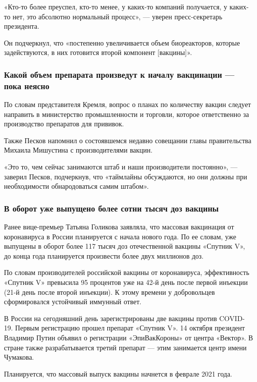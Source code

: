 «Кто-то более преуспел, кто-то менее, у каких-то компаний получается, у
каких-то нет, это абсолютно нормальный процесс», — уверен пресс-секретарь
президента.

Он подчеркнул, что «постепенно увеличивается объем биореакторов, которые
задействуются, в них готовится второй компонент [вакцины]».

\subsubsection{Какой объем препарата произведут к началу вакцинации — пока неясно}

По словам представителя Кремля, вопрос о планах по количеству вакцин следует
направить в министерство промышленности и торговли, которое ответственно за
производство препаратов для прививок.

Также Песков напомнил о состоявшемся недавно совещании главы правительства
Михаила Мишустина с производителями вакцин.

«Это то, чем сейчас занимаются штаб и наши производители постоянно», — заверил
Песков, подчеркнув, что «таймлайны обсуждаются, но они должны при необходимости
обнародоваться самим штабом».

\subsubsection{В оборот уже выпущено более сотни тысяч доз вакцины}

Ранее вице-премьер Татьяна Голикова заявляла, что массовая вакцинация от
коронавируса в России планируется с начала нового года. По ее словам, уже
выпущены в оборот более 117 тысяч доз отечественной вакцины «Спутник V», до
конца года планируется произвести более двух миллионов доз.

По словам производителей российской вакцины от коронавируса, эффективность
«Спутник V» превысила 95 процентов уже на 42-й день после первой инъекции (21-й
день после второй инъекции). К этому времени у добровольцев сформировался
устойчивый иммунный ответ.

В России на сегодняшний день зарегистрированы две вакцины против COVID-19.
Первым регистрацию прошел препарат «Спутник V». 14 октября президент Владимир
Путин объявил о регистрации «ЭпиВакКороны» от центра «Вектор». В стране также
разрабатывается третий препарат — этим занимается центр имени Чумакова.


Планируется, что массовый выпуск вакцины начнется в феврале 2021 года.

